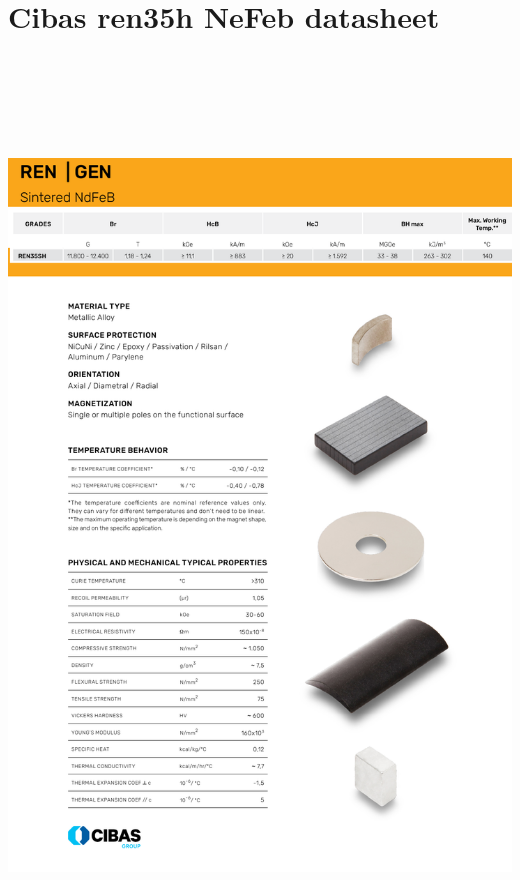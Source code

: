 \section{Cibas ren35h NeFeb datasheet}\label{appendixmagn}
\begin{center}
\includegraphics[height=690pt]{extra/cibas_modificato.pdf}
\end{center}


\restoregeometry